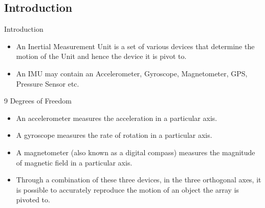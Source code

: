 \documentclass{beamer}
\begin{document}
\subsection{Introduction}
\begin{frame}{Introduction}
  \begin{itemize}
  \item {
    An Inertial Measurement Unit is a set of various devices that determine the motion of the Unit and hence the device it is pivot to.
  }
  \item{
    An IMU may contain an Accelerometer, Gyroscope, Magnetometer, GPS, Pressure Sensor etc.
  }
  \end{itemize}
\end{frame}
\begin{frame}{9 Degrees of Freedom}
  \begin{itemize}
  \item{
    An accelerometer measures the acceleration in a particular axis.
  }
  \item{
    A gyroscope measures the rate of rotation in a particular axis.
  }
  \item{
    A magnetometer (also known as a digital compass) measures the magnitude of magnetic field in a particular axis.
  }
  \item{
    Through a combination of these three devices, in the three orthogonal axes, it is possible to accurately reproduce the motion of an object the array is pivoted to.
  }
  \end{itemize}
\end{frame}
\end{document}
